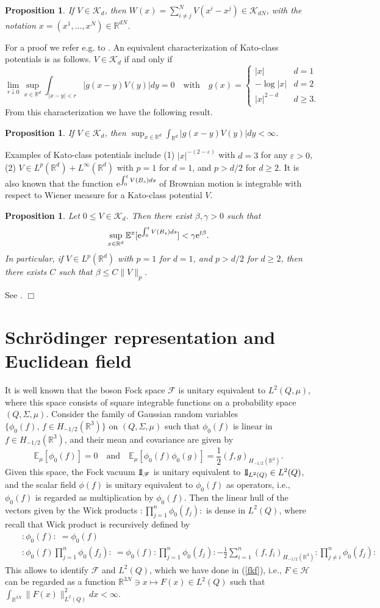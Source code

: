 \documentclass[11pt]{article}
\newtheorem{proposition}[theorem]{Proposition}
\providecommand{\bp}[1]{\begin{proposition}\label{#1}}
\providecommand{\ep}{\end{proposition}}
\def\bbbone{{\mathchoice {\rm 1\mskip-4mu l} {\rm 1\mskip-4mu l}
{\rm 1\mskip-4.5mu l} {\rm 1\mskip-5mu l}}}
\def\one{\bbbone}
\newcommand{\Ebb}{{\mathbb E}}
\providecommand{\eq}[1]{\begin{equation}\label{#1}}
\providecommand{\en}{\end{equation}}
\providecommand{\qed}{\hfill {$\Box$}\par\medskip}
\providecommand{\BR}{{\mathbb{R}^3 }}
\providecommand{\RR}{\mathbb{R}}
\providecommand{\kak}[1]{(\ref{#1})}
\providecommand{\ms}[1]{\mathscr{#1}}
\providecommand{\fff}{\mathscr{F}}
\providecommand{\lkk}{\left\{}
\providecommand{\half}{\frac{1}{2}}
\providecommand{\han}{{1/2}}
\providecommand{\hhh}{\ms H} %
\providecommand{\e}{{\rm e}}
\providecommand{\1}{\mathbb{1}}
\providecommand{\eps}{\varepsilon}
\begin{document}
\bp{multi}
If $V\in \ms K_d$, then $W(x)=\sum_{i\not =j}^N V(x^i-x^j) \in \ms K_{dN}$, with the notation $x=(x^1,...,x^N)
\in \RR^{dN}$.
\ep
For a proof we refer e.g. to \cite[p.7]{cfks08}. An equivalent characterization of Kato-class potentials is
as follows. $V\in \ms K_d$ if and only if
\eq{eq}
\lim_{r\downarrow 0}\sup_{x\in\RR^d}\int_{|x-y|<r}|g(x-y) V(y)|dy=0 \quad \mbox{with} \quad
g(x)=\lkk \begin{array}{ll}
|x|& d=1\\
-\log|x|&d=2\\
|x|^{2-d}&d\geq 3.
\end{array}
\right.
\en
From this characterization we have the following result.
\bp
{sup}
If $V\in \ms K_d$, then $\sup_{x\in\RR^d} \int_{\RR^d} |g(x-y) V(y)| dy <\infty$.
\ep
Examples of Kato-class potentials include
(1)  $|x|^{-(2-\eps)}$ with  $d=3$ for any $\eps>0$,
(2) $V\in L^p(\RR^d)+L^\infty(\RR^d)$ with $p=1$ for $d=1$, and $p>d/2$ for $d\geq 2$.
It is also known that the function $\e^{\int_0^t V(B_s) ds}$ of Brownian motion is integrable
with respect to Wiener measure for a Kato-class potential $V$.
\bp{expexp}
Let $0\leq V\in \ms K_d$. Then there exist $\beta, \gamma>0$ such that
\eq{alpha}
\sup_{x\in\RR^d}\Ebb^x[\e^{\int_0^t V(B_s) ds}]<\gamma \e^{t\beta}.
\en
In particular, if $V\in L^p(\RR^d)$ with $p=1$ for $d=1$, and $p>d/2$ for $d\geq 2$, then there
exists $C$ such that $\beta \leq C\|V\|_p$.
\ep
\proof
See \cite[Lemma 3.38]{lhb11}.
\qed

\section{Schr\"odinger representation and Euclidean field}
\label{appb}
It is well known that the boson Fock space $\fff$ is unitary equivalent to $L^2(Q,\mu)$, where this
space consists of square integrable functions on a probability space $(Q,\Sigma,\mu)$. Consider the
family of Gaussian random variables $\{\phi_0(f), \, f\in H_{-1/2}(\BR)\}$ on $(Q,\Sigma,\mu)$ such
that $\phi_0(f)$ is linear in $f\in H_{-\han}(\RR^3)$, and their mean and covariance are given by
$$
\Ebb_{\mu}[\phi_0(f)]=0 \quad \mbox{and} \quad \Ebb_{\mu}[\phi_0(f)\phi_0(g)]
=\half (f, g)_{H_{-\han}(\RR^3)}.
$$
Given this space, the Fock vacuum $\one_\fff$ is unitary equivalent to $\one_{L^2(Q)}\in L^2(Q)$, and
the scalar field $\phi(f)$ is unitary equivalent to $\phi_0(f)$ as operators, i.e., $\phi_0(f)$ is
regarded as multiplication by $\phi_0(f)$. Then the linear hull of the vectors given by the Wick products
$:\prod_{j=1}^n \phi_0(f_j):$ is dense in $L^2(Q)$, where recall that Wick product is recursively defined
by
\begin{eqnarray*}
&&
{:\phi_0(f):} \; =\phi_0(f)  \\
&&
{:\phi_0(f)\prod_{j=1}^n \phi_0(f_j):} \: =
\phi_0(f):\prod_{j=1}^n \phi_0(f_j):-\half\sum_{i=1}^n (f,f_i)_{H_{-\han}(\RR^3)} :\prod_{j\not=i}^n \phi_0(f_j):
\end{eqnarray*}
This allows to identify $\fff$ and $L^2(Q)$, which we have done in \kak{fkf}, i.e., $F\in \hhh$ can be regarded
as a function $\RR^{3N}\ni x\mapsto F(x)\in L^2(Q)$ such that $\int_{\RR^{3N}}\|F(x)\|^2_{L^2(Q)} dx<\infty$.
\end{document}
